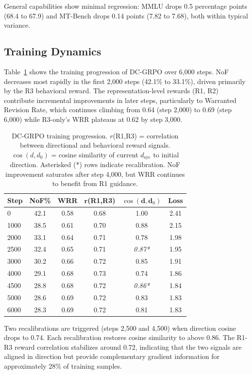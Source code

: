 \documentclass[11pt,a4paper]{article}
\newcommand{\dsyc}{$d_{\mathrm{syc}}$}
\begin{document}
General capabilities show minimal regression: MMLU drops 0.5 percentage points (68.4 to 67.9) and MT-Bench drops 0.14 points (7.82 to 7.68), both within typical variance.

\subsection{Training Dynamics}

Table~\ref{tab:training} shows the training progression of DC-GRPO over 6,000 steps. NoF decreases most rapidly in the first 2,000 steps (42.1\% to 33.1\%), driven primarily by the R3 behavioral reward. The representation-level rewards (R1, R2) contribute incremental improvements in later steps, particularly to Warranted Revision Rate, which continues climbing from 0.64 (step 2,000) to 0.69 (step 6,000) while R3-only's WRR plateaus at 0.62 by step 3,000.

\begin{table}[t]
\centering
\small
\begin{tabular}{lccccc}
\toprule
\textbf{Step} & \textbf{NoF\%} & \textbf{WRR} & $\boldsymbol{r}$(R1,R3) & $\cos(\boldsymbol{d},\boldsymbol{d}_0)$ & \textbf{Loss} \\
\midrule
0    & 42.1 & 0.58 & 0.68 & 1.00 & 2.41 \\
1000 & 38.5 & 0.61 & 0.70 & 0.88 & 2.15 \\
2000 & 33.1 & 0.64 & 0.71 & 0.78 & 1.98 \\
2500 & 32.4 & 0.65 & 0.71 & \emph{0.87*} & 1.95 \\
3000 & 30.2 & 0.66 & 0.72 & 0.85 & 1.91 \\
4000 & 29.1 & 0.68 & 0.73 & 0.74 & 1.86 \\
4500 & 28.8 & 0.68 & 0.72 & \emph{0.86*} & 1.84 \\
5000 & 28.6 & 0.69 & 0.72 & 0.83 & 1.83 \\
6000 & 28.3 & 0.69 & 0.72 & 0.81 & 1.83 \\
\bottomrule
\end{tabular}
\caption{DC-GRPO training progression. $r$(R1,R3) = correlation between directional and behavioral reward signals. $\cos(d, d_0)$ = cosine similarity of current \dsyc{} to initial direction. Asterisked (*) rows indicate recalibration. NoF improvement saturates after step 4,000, but WRR continues to benefit from R1 guidance.}
\label{tab:training}
\end{table}

Two recalibrations are triggered (steps 2,500 and 4,500) when direction cosine drops to 0.74. Each recalibration restores cosine similarity to above 0.86. The R1-R3 reward correlation stabilizes around 0.72, indicating that the two signals are aligned in direction but provide complementary gradient information for approximately 28\% of training samples.
\end{document}
